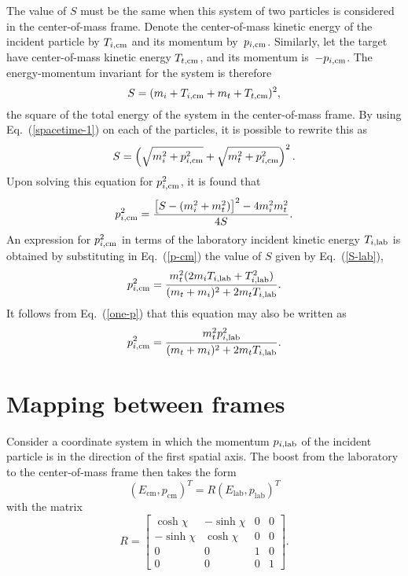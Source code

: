 {The value of $S$ must be the same when this
system of two particles is considered in the center-of-mass
frame.  Denote the center-of-mass kinetic energy of
the incident particle by $T_{i,\textrm{cm}}$ and its momentum by~$p_{i,\textrm{cm}}$.
Similarly, let the target have center-of-mass kinetic energy $T_{t,\textrm{cm}}$, 
and its momentum is~$-p_{i,\textrm{cm}}$.  The energy-momentum invariant
for the system is therefore
\begin{equation}
  S = (m_i + T_{i,\textrm{cm}} + m_t + T_{t,\textrm{cm}})^2,
 \label{spacetime-cm}
\end{equation}
the square of the total energy of the system in the center-of-mass frame.
By using Eq.~(\ref{spacetime-1}) on each of the particles, it
is possible to rewrite this as
$$
  S = \left(
    \sqrt{m_i^2 + p_{i,\textrm{cm}}^2 } +
       \sqrt{m_t^2 + p_{i,\textrm{cm}}^2 }
   \right)^2.
$$
Upon solving this equation for $p_{i,\textrm{cm}}^2$, it is found that
\begin{equation}
  p_{i,\textrm{cm}}^2 = \frac{ \left[S - (m_i^2 + m_t^2)\right]^2 -
                 4 m_i^2 m_t^2 }
                {4 S }.
  \label{p-cm}
\end{equation}
An expression for $p_{i,\textrm{cm}}^2$ in terms of the
laboratory incident kinetic energy $T_{i,\textrm{lab}}$ is obtained by substituting
in Eq.~(\ref{p-cm}) the value of $S$ given by Eq.~(\ref{S-lab}),
\begin{equation}
  p_{i,\textrm{cm}}^2 = \frac{m_t^2( 2 m_i T_{i,\textrm{lab}} + T_{i,\textrm{lab}}^2)}
              {(m_t + m_i )^2 + 2m_t T_{i,\textrm{lab}}}.
  \label{p-cm-1}
\end{equation}
It follows from Eq.~(\ref{one-p}) that this equation may also
be written as
$$
  p_{i,\textrm{cm}}^2 = \frac{m_t^2 p_{i,\textrm{lab}}^2 }
                {(m_t + m_i )^2 + 2m_t T_{i,\textrm{lab}}}.
$$

\section{Mapping between frames}
Consider a coordinate system in which the momentum
$p_{i,\textrm{lab}}$ of the incident particle is in the direction of
the first spatial axis.  The boost from
the laboratory to the center-of-mass frame then takes the
form
$$
  (E_{\text{cm}}, p_{\text{cm}})^T = R (E_{\text{lab}}, p_{\text{lab}})^T
$$
with the matrix
\begin{equation}
   R =
    \begin{bmatrix}
     \cosh \chi & -\sinh \chi & 0 & 0 \\
     -\sinh \chi & \cosh \chi & 0 & 0 \\
     0  & 0 & 1 & 0 \\
     0  & 0 & 0 & 1
  \end{bmatrix}.
  \label{R-3}
\end{equation}

}
